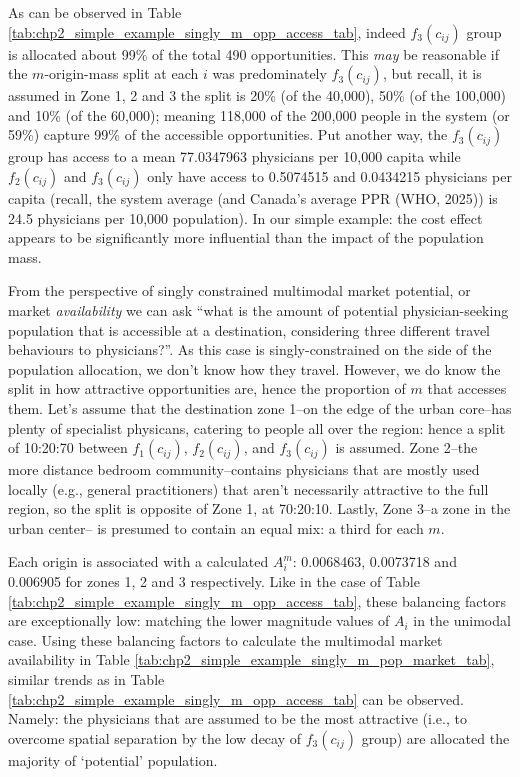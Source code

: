 \documentclass[
11pt, %
oneside, %
english, %
singlespacing, %
]{macthesis} %
\begin{document}


As can be observed in Table \ref{tab:chp2_simple_example_singly_m_opp_access_tab}, indeed \(f_3(c_{ij})\) group is allocated about 99\% of the total 490 opportunities. This \emph{may} be reasonable if the \(m\)-origin-mass split at each \(i\) was predominately \(f_3(c_{ij})\), but recall, it is assumed in Zone 1, 2 and 3 the split is 20\% (of the 40,000), 50\% (of the 100,000) and 10\% (of the 60,000); meaning 118,000 of the 200,000 people in the system (or 59\%) capture 99\% of the accessible opportunities. Put another way, the \(f_3(c_{ij})\) group has access to a mean 77.0347963 physicians per 10,000 capita while \(f_2(c_{ij})\) and \(f_3(c_{ij})\) only have access to 0.5074515 and 0.0434215 physicians per capita (recall, the system average (and Canada's average PPR (WHO, 2025)) is 24.5 physicians per 10,000 population). In our simple example: the cost effect appears to be significantly more influential than the impact of the population mass.

From the perspective of singly constrained multimodal market potential, or market \emph{availability} we can ask ``what is the amount of potential physician-seeking population that is accessible at a destination, considering three different travel behaviours to physicians?''. As this case is singly-constrained on the side of the population allocation, we don't know how they travel. However, we do know the split in how attractive opportunities are, hence the proportion of \(m\) that accesses them. Let's assume that the destination zone 1--on the edge of the urban core--has plenty of specialist physicans, catering to people all over the region: hence a split of 10:20:70 between \(f_1(c_{ij})\), \(f_2(c_{ij})\), and \(f_3(c_{ij})\) is assumed. Zone 2--the more distance bedroom community--contains physicians that are mostly used locally (e.g., general practitioners) that aren't necessarily attractive to the full region, so the split is opposite of Zone 1, at 70:20:10. Lastly, Zone 3--a zone in the urban center-- is presumed to contain an equal mix: a third for each \(m\).

Each origin is associated with a calculated \(A_i^m\): 0.0068463, 0.0073718 and 0.006905 for zones 1, 2 and 3 respectively. Like in the case of Table \ref{tab:chp2_simple_example_singly_m_opp_access_tab}, these balancing factors are exceptionally low: matching the lower magnitude values of \(A_i\) in the unimodal case. Using these balancing factors to calculate the multimodal market availability in Table \ref{tab:chp2_simple_example_singly_m_pop_market_tab}, similar trends as in Table \ref{tab:chp2_simple_example_singly_m_opp_access_tab} can be observed. Namely: the physicians that are assumed to be the most attractive (i.e., to overcome spatial separation by the low decay of \(f_3(c_{ij})\) group) are allocated the majority of `potential' population.
\end{document}

